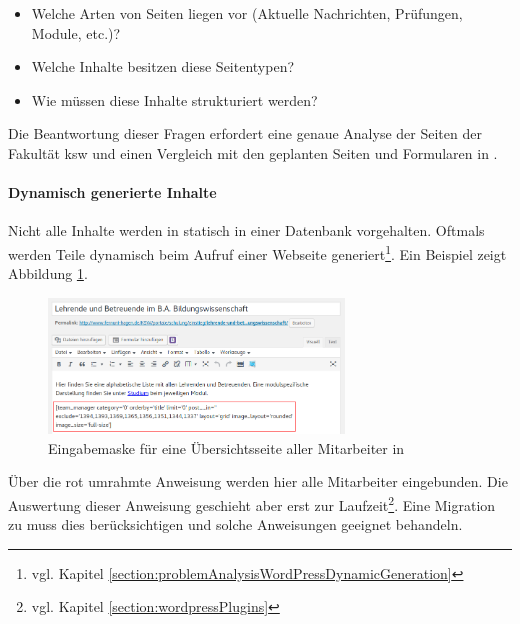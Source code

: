         \begin{itemize}
            \item Welche Arten von Seiten liegen vor (Aktuelle Nachrichten, Prüfungen, Module, etc.)?
            \item Welche Inhalte besitzen diese Seitentypen?
            \item Wie müssen diese Inhalte strukturiert werden?
        \end{itemize}

        Die Beantwortung dieser Fragen erfordert eine genaue Analyse der Seiten der Fakultät \gls{ksw}
        und einen Vergleich mit den geplanten Seiten und Formularen in {\imperia}.
        
        \paragraph{Dynamisch generierte Inhalte}
        Nicht alle Inhalte werden in {\wordpress} statisch in einer Datenbank vorgehalten.
        Oftmals werden Teile dynamisch beim Aufruf einer Webseite
        generiert\footnote{vgl. Kapitel \ref{section:problemAnalysisWordPressDynamicGeneration}}.
        Ein Beispiel zeigt Abbildung \ref{image:introductionFernUniWordpressOverviewForm}.

        \begin{figure}[htb]
            \centering
            \includegraphics[width=0.7\textwidth]{../resources/wordpress/teachers-overview.png}
            \caption{Eingabemaske für eine Übersichtsseite aller Mitarbeiter in {\wordpress}}
            \label{image:introductionFernUniWordpressOverviewForm}
        \end{figure}

        Über die rot umrahmte Anweisung werden hier alle Mitarbeiter eingebunden.
        Die Auswertung dieser Anweisung geschieht aber erst zur
        Laufzeit\footnote{vgl. Kapitel \ref{section:wordpressPlugins}}.
        Eine Migration zu {\imperia} muss dies berücksichtigen und solche Anweisungen
        geeignet behandeln.

